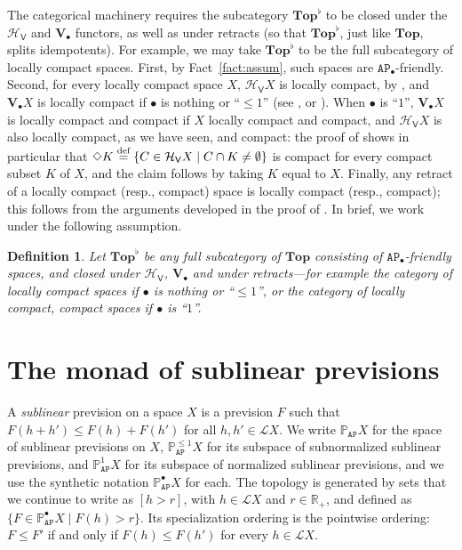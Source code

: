 \documentclass[preprint,12pt]{elsarticle}
\newcommand\eqdef{\mathrel{\buildrel \text{def}\over=}}
\newcommand{\Rp}{\mathbb{R}_+}
\newcommand\Lform{\mathcal L}
\newcommand\Pred{\mathbb{P}}
\newcommand\Angel{{\mathtt{A}}}
\newcommand\Nature{{\mathtt{P}}}
\newcommand\AN{{\Angel\Nature}}
\newcommand\Hoare{{\mathcal H}}
\newcommand\Vt{\mathsf{V}}
\newcommand\HV{\Hoare_\Vt}
\newcommand\Val{{\mathbf V}}
\newcommand\Topcat{\mathbf{Top}}
\newtheorem{definition}[theorem]{Definition}
\begin{document}
The categorical machinery requires the subcategory $\Topcat^\flat$ to
be closed under the $\HV$ and $\Val_\bullet$ functors, as well as
under retracts (so that $\Topcat^\flat$, just like $\Topcat$, splits
idempotents).  For example, we may take $\Topcat^\flat$ to be the full
subcategory of locally compact spaces.  First, by
Fact~\ref{fact:assum}, such spaces are $\AN_\bullet$-friendly.
Second, for every locally compact space $X$, $\HV X$ is locally
compact, by \cite[Proposition 6.11]{schalk:diss}, and $\Val_\bullet X$
is locally compact if $\bullet$ is nothing or ``$\leq 1$'' (see
\cite[Theorem 12.2]{JGL:projlim:prev}, or
\cite[Theorem~4.1]{JGL:vlc}).  When $\bullet$ is ``$1$'',
$\Val_\bullet X$ is locally compact and compact if $X$ locally compact
and compact, and $\HV X$ is also locally compact, as we have seen, and
compact: the proof of \cite[Proposition 6.11]{schalk:diss} shows in
particular that
$\Diamond K \eqdef \{C \in \HV X \mid C \cap K \neq \emptyset\}$ is
compact for every compact subset $K$ of $X$, and the claim follows by
taking $K$ equal to $X$.  Finally, any retract of a locally compact
(resp., compact) space is locally compact (resp., compact); this
follows from the arguments developed in the proof of \cite[Proposition
2.17]{Jung:scs:prob}.  In brief, we work under the following
assumption.
\begin{definition}
  \label{defn:Top:flat}
  Let $\Topcat^\flat$ be any full subcategory of $\Topcat$ consisting
  of $\AN_\bullet$-friendly spaces, and closed under $\HV$,
  $\Val_\bullet$ and under retracts---for example the category of
  locally compact spaces if $\bullet$ is nothing or ``$\leq 1$'', or
  the category of locally compact, compact spaces if $\bullet$ is
  ``$1$''.
\end{definition}

\section{The monad of sublinear previsions}
\label{sec:monad-subl-prev}


A \emph{sublinear} prevision on a space $X$ is a prevision $F$ such
that $F (h+h') \leq F (h)+F (h')$ for all $h, h' \in \Lform X$.  We
write $\Pred_\AN X$ for the space of sublinear previsions on $X$,
$\Pred_\AN^{\leq 1} X$ for its subspace of subnormalized sublinear
previsions, and $\Pred_\AN^1 X$ for its subspace of normalized
sublinear previsions, and we use the synthetic notation
$\Pred_\AN^\bullet X$ for each.  The topology is generated by sets
that we continue to write as $[h > r]$, with $h \in \Lform X$ and
$r \in \Rp$, and defined as
$\{F \in \Pred_\AN^\bullet X \mid F (h) > r\}$.  Its specialization
ordering is the pointwise ordering: $F \leq F'$ if and only if
$F (h) \leq F (h')$ for every $h \in \Lform X$.
\end{document}

